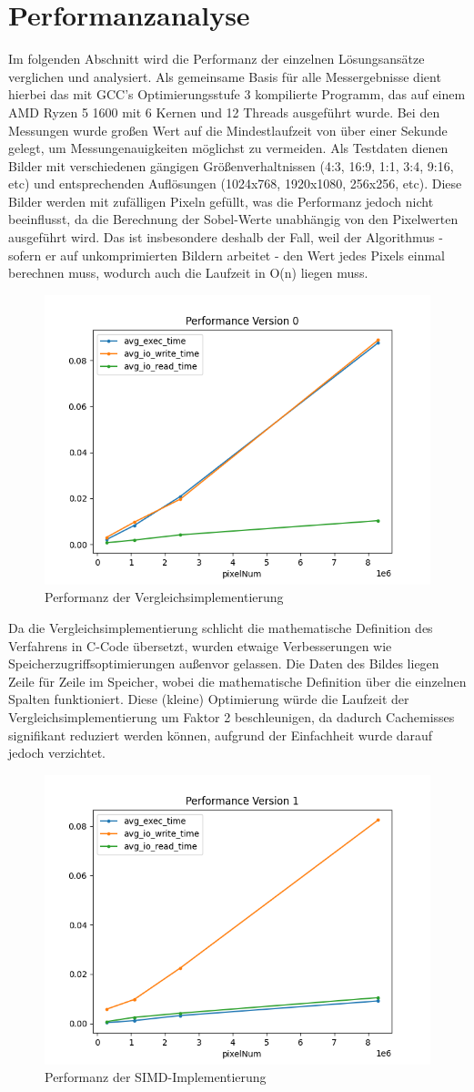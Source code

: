 \documentclass[course=erap]{aspdoc}
\begin{document}
\section{Performanzanalyse}
Im folgenden Abschnitt wird die Performanz der einzelnen Lösungsansätze verglichen und analysiert.
Als gemeinsame Basis für alle Messergebnisse dient hierbei das mit GCC's Optimierungsstufe 3 kompilierte Programm, das auf einem AMD Ryzen 5 1600 mit 6 Kernen und 12 Threads ausgeführt wurde.
Bei den Messungen wurde großen Wert auf die Mindestlaufzeit von über einer Sekunde gelegt, um Messungenauigkeiten möglichst zu vermeiden.
Als Testdaten dienen Bilder mit verschiedenen gängigen Größenverhaltnissen (4:3, 16:9, 1:1, 3:4, 9:16, etc) und entsprechenden Auflösungen (1024x768, 1920x1080, 256x256, etc).
Diese Bilder werden mit zufälligen Pixeln gefüllt, was die Performanz jedoch nicht beeinflusst, da die Berechnung der Sobel-Werte unabhängig von den Pixelwerten ausgeführt wird.
Das ist insbesondere deshalb der Fall, weil der Algorithmus - sofern er auf unkomprimierten Bildern arbeitet - den Wert jedes Pixels einmal berechnen muss, wodurch auch die Laufzeit in O(n) liegen muss.
\begin{figure}[H]
    \centering
    \includegraphics[width=0.5\columnwidth]{graphics/performance_vergleich}
    \caption{Performanz der Vergleichsimplementierung}
    \label{fig:performanz}
\end{figure}
Da die Vergleichsimplementierung schlicht die mathematische Definition des Verfahrens in C-Code übersetzt, wurden etwaige Verbesserungen wie Speicherzugriffsoptimierungen außenvor gelassen.
Die Daten des Bildes liegen Zeile für Zeile im Speicher, wobei die mathematische Definition über die einzelnen Spalten funktioniert.
Diese (kleine) Optimierung würde die Laufzeit der Vergleichsimplementierung um Faktor 2 beschleunigen, da dadurch Cachemisses signifikant reduziert werden können, aufgrund der Einfachheit wurde darauf jedoch verzichtet.
\begin{figure}[H]
    \centering
    \includegraphics[width=0.5\columnwidth]{graphics/performance_simd}
    \caption{Performanz der SIMD-Implementierung}
    \label{fig:performanz-simd}
\end{figure}
\end{document}
